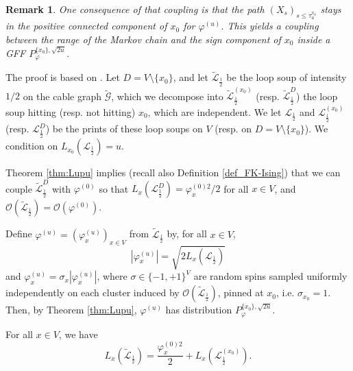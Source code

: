 \documentclass[11pt,a4paper]{amsart}
\numberwithin{equation}{section}
\newtheorem{remark}[proposition]{Remark}
\begin{document}
\begin{remark}
One consequence of that coupling is that the path $(X_{s})_{s\le \tau_{u}^{x_{0}}}$ stays in the 
positive connected component of ${x_0}$ for $\varphi^{(u)}$. This yields a coupling between the range
of the Markov chain and the sign component of $x_{0}$ inside a GFF $P_{\varphi}^{\lbrace x_{0}\rbrace,\sqrt{2u}}$.
\end{remark}

The proof is based on
\cite{Lupu2014LoopsGFF}.  Let $D=V\setminus\{x_0\}$, and let $\tilde{\mathcal{L}}_{\frac{1}{2}}$ be the loop soup of intensity $1/2$ on the cable graph $\tilde{\mathcal{G}}$, which we decompose into $\tilde{\mathcal{L}}_{\frac{1}{2}}^{(x_0)}$ (resp. $\tilde{\mathcal{L}}_{\frac{1}{2}}^{D}$) the loop soup hitting (resp. not hitting) $x_0$, which are independent. We let $\mathcal{L}_{\frac{1}{2}}$ and $\mathcal{L}_{\frac{1}{2}}^{(x_0)}$ (resp.  $\mathcal{L}_{\frac{1}{2}}^{D}$) be the prints of these loop soups on $V$ (resp. on $D=V\setminus\{x_0\}$). We condition on $L_{x_0}(\mathcal{L}_{\frac{1}{2}})=u$. 

Theorem \ref{thm:Lupu} implies (recall also Definition \ref{def_FK-Ising}) that we can couple $\tilde{\mathcal{L}}_{\frac{1}{2}}^{D}$ with $\varphi^{(0)}$ so that 
$L_x(\mathcal{L}_{\frac{1}{2}}^{D})=\varphi_x^{(0)2}/2$ for all $x\in V$, and 
$\mathcal{O}(\tilde{\mathcal{L}}_{\frac{1}{2}})=\mathcal{O}(\varphi^{(0)})$. 

Define 
$\varphi^{(u)}=(\varphi^{(u)}_x)_{x\in V}$ from 
$\tilde{\mathcal{L}}_{\frac{1}{2}}$ by, for all $x\in V$, 
\begin{equation*}
\label{abs}
|\varphi_x^{(u)}|=\sqrt{2L_x(\mathcal{L}_{\frac{1}{2}})}
\end{equation*}
and $\varphi_x^{(u)}=\sigma_x|\varphi_x^{(u)}|$, where $\sigma\in\{-1,+1\}^V$ are random spins sampled uniformly independently on each cluster induced by $\mathcal{O}(\tilde{\mathcal{L}}_{\frac{1}{2}})$, pinned at $x_0$,  i.e. $\sigma_{x_0}=1$. Then, by Theorem \ref{thm:Lupu}, $\varphi^{(u)}$ has distribution $P_{\varphi}^{\lbrace x_{0}\rbrace,\sqrt{2u}}$.

For all $x\in V$, we have
$$L_x(\tilde{\mathcal{L}}_{\frac{1}{2}})=\frac{\varphi_x^{(0)2}}{2}+L_x(\mathcal{L}_{\frac{1}{2}}^{(x_0)}).$$
\end{document}
